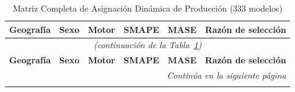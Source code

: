 \documentclass[12pt, letterpaper]{article}
\begin{document}
\footnotesize
\setlength{\tabcolsep}{3pt}
\begin{longtable}{l l >{\bfseries}c r r l}
\caption{Matriz Completa de Asignación Dinámica de Producción (333 modelos)} \label{tab:long_333} \\
\toprule
\textbf{Geografía} & \textbf{Sexo} & \textbf{Motor} & \textbf{SMAPE} & \textbf{MASE} & \textbf{Razón de selección} \\
\midrule
\endfirsthead

\multicolumn{6}{c}{\small\textit{(continuación de la Tabla~\ref{tab:long_333})}} \\
\toprule
\textbf{Geografía} & \textbf{Sexo} & \textbf{Motor} & \textbf{SMAPE} & \textbf{MASE} & \textbf{Razón de selección} \\
\midrule
\endhead

\midrule
\multicolumn{6}{r}{\small\textit{Continúa en la siguiente página}} \\
\endfoot


\end{longtable}
\end{document}
